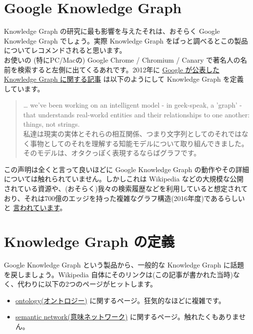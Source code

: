 \documentclass[a4paper, dvipdfmx, 10pt]{article}
\begin{document}
\section{Google Knowledge Graph}
\label{sec:org6e9c8cf}
Knowledge Graph の研究に最も影響を与えたそれは、おそらく Google Knowledge Graph でしょう。実際 Knowledge Graph をぱっと調べるとこの製品についてレコメンドされると思います。\\

お使いの (特にPC/Macの) Google Chrome / Chromium / Canary で著名人の名前を検索すると左側に出てくるあれです。2012年に \href{https://googleblog.blogspot.co.uk/2012/05/introducing-knowledge-graph-things-not.html}{Google が公表した Knowledge Graph に関する記事} は以下のようにして Knowledge Graph を定義しています。\\

\begin{quote}
\ldots{} we've been working on an intelligent model - in geek-speak, a 'graph' -  that understands real-workd entities and their relationships to one another: things, not strings.\\
私達は現実の実体とそれらの相互関係、つまり文字列としてのそれではなく事物としてのそれを理解する知能モデルについて取り組んできました。そのモデルは、オタクっぽく表現するならばグラフです。\\
\end{quote}

この声明は全くと言って良いほどに Google Knowledge Graph の動作やその詳細については触れられていません。しかしこれは Wikipedia などの大規模な公開されている資源や、(おそらく)我々の検索履歴などを利用していると想定されており、それは700億のエッジを持った複雑なグラフ構造(2016年度)であるらしいと \href{http://www.theverge.com/2016/10/4/13122406/google-phone-event-stats}{言われています}。\\

\section{Knowledge Graph の定義}
\label{sec:org71d77e0}
Google Knowledge Graph という製品から、一般的な Knowledge Graph に話題を戻しましょう。Wikipedia 自体にそのリンクは(この記事が書かれた当時)なく、代わりに以下の2つのページがヒットします。\\

\begin{itemize}
\item \href{https://en.wikipedia.org/wiki/Ontology\_(information\_science)}{ontology(オントロジー)} に関するページ。狂気的なほどに複雑です。\\
\item \href{https://en.wikipedia.org/wiki/Semantic\_network}{semantic network(意味ネットワーク)} に関するページ。触れたくもありません。\\
\end{itemize}
\end{document}
